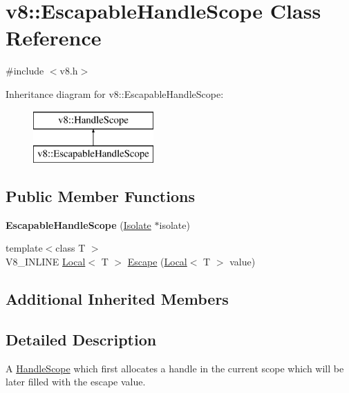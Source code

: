 \hypertarget{classv8_1_1_escapable_handle_scope}{}\section{v8\+:\+:Escapable\+Handle\+Scope Class Reference}
\label{classv8_1_1_escapable_handle_scope}


{\ttfamily \#include $<$v8.\+h$>$}

Inheritance diagram for v8\+:\+:Escapable\+Handle\+Scope\+:\begin{figure}[H]
\begin{center}
\leavevmode
\includegraphics[height=2.000000cm]{classv8_1_1_escapable_handle_scope}
\end{center}
\end{figure}
\subsection*{Public Member Functions}
\begin{DoxyCompactItemize}
\item 
\hypertarget{classv8_1_1_escapable_handle_scope_aea39a7fd4dee6da31f3921ff891e1731}{}{\bfseries Escapable\+Handle\+Scope} (\hyperlink{classv8_1_1_isolate}{Isolate} $\ast$isolate)\label{classv8_1_1_escapable_handle_scope_aea39a7fd4dee6da31f3921ff891e1731}

\item 
{\footnotesize template$<$class T $>$ }\\V8\+\_\+\+I\+N\+L\+I\+N\+E \hyperlink{classv8_1_1_local}{Local}$<$ T $>$ \hyperlink{classv8_1_1_escapable_handle_scope_afdf0d3850978f65d1a827f78b3a2b6fd}{Escape} (\hyperlink{classv8_1_1_local}{Local}$<$ T $>$ value)
\end{DoxyCompactItemize}
\subsection*{Additional Inherited Members}


\subsection{Detailed Description}
A \hyperlink{classv8_1_1_handle_scope}{Handle\+Scope} which first allocates a handle in the current scope which will be later filled with the escape value. 

